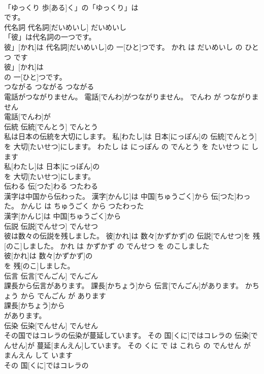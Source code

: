 \documentclass[8pt]{extreport}
\begin{document}
\begin{CJK}{UTF8}{min}
\\	「ゆっくり 歩[ある]く」の「ゆっくり」は
\\	です。			
\\	代名詞	代名詞[だいめいし]	だいめいし	
\\	「彼」は代名詞の一つです。	
\\	彼」[かれ]は 代名詞[だいめいし]の 一[ひと]つです。	かれ は だいめいし の ひとつ です	
\\	彼」[かれ]は
\\	の 一[ひと]つです。			
\\	つながる	つながる	つながる	
\\	電話がつながりません。	電話[でんわ]がつながりません。	でんわ が つながりません	
\\	電話[でんわ]が
\\	伝統	伝統[でんとう]	でんとう	
\\	私は日本の伝統を大切にします。	私[わたし]は 日本[にっぽん]の 伝統[でんとう]を 大切[たいせつ]にします。	わたし は にっぽん の でんとう を たいせつ に します	
\\	私[わたし]は 日本[にっぽん]の
\\	を 大切[たいせつ]にします。			
\\	伝わる	伝[つた]わる	つたわる	
\\	漢字は中国から伝わった。	漢字[かんじ]は 中国[ちゅうごく]から 伝[つた]わった。	かんじ は ちゅうごく から つたわった	
\\	漢字[かんじ]は 中国[ちゅうごく]から
\\	伝説	伝説[でんせつ]	でんせつ	
\\	彼は数々の伝説を残しました。	彼[かれ]は 数々[かずかず]の 伝説[でんせつ]を 残[のこ]しました。	かれ は かずかず の でんせつ を のこしました	
\\	彼[かれ]は 数々[かずかず]の
\\	を 残[のこ]しました。			
\\	伝言	伝言[でんごん]	でんごん	
\\	課長から伝言があります。	課長[かちょう]から 伝言[でんごん]があります。	かちょう から でんごん が あります	
\\	課長[かちょう]から
\\	があります。			
\\	伝染	伝染[でんせん]	でんせん	
\\	その国ではコレラの伝染が蔓延しています。	その 国[くに]ではコレラの 伝染[でんせん]が 蔓延[まんえん]しています。	その くに で は これら の でんせん が まんえん して います	
\\	その 国[くに]ではコレラの

\end{CJK}
\end{document}
